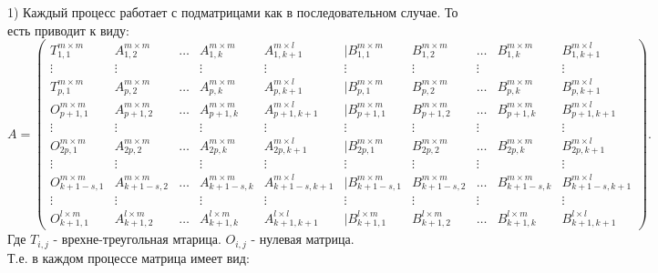 \documentclass[a4paper,12pt]{article}
\begin{document}
1) Каждый процесс работает с подматрицами как в последовательном случае. То есть приводит к виду:
\begin{equation*}
A = 
\begin{pmatrix}
T_{1,1}^{m \times m} & A_{1,2}^{m \times m} & \dots & A_{1,k}^{m \times m} & A_{1,k+1}^{m \times l} & | B_{1,1}^{m \times m} & B_{1,2}^{m \times m} & \dots & B_{1,k}^{m\times m} & B_{1,k+1}^{m \times l}\\
\vdots & \vdots &  & \vdots & \vdots &\vdots  &\vdots   &\vdots  & \  &\vdots \\
T_{p,1}^{m \times m} & A_{p,2}^{m \times m} & \dots & A_{p,k}^{m \times m} & A_{p,k+1}^{m \times l}& | B_{p,1}^{m \times m} & B_{p,2}^{m \times m} & \dots & B_{p,k}^{m\times m} & B_{p,k+1}^{m \times l}\\
\hline
O_{p+1,1}^{m \times m} & A_{p+1,2}^{m \times m} & \dots & A_{p+1,k}^{m \times m} & A_{p+1,k+1}^{m \times l} & | B_{p+1,1}^{m \times m} & B_{p+1,2}^{m \times m} & \dots & B_{p+1,k}^{m\times m} & B_{p+1,k+1}^{m \times l}\\
\vdots & \vdots &  & \vdots & \vdots &\vdots  &\vdots   &\vdots  & \  &\vdots \\O_{2p,1}^{m \times m} & A_{2p,2}^{m \times m} & \dots & A_{2p,k}^{m \times m} & A_{2p,k+1}^{m \times l} & | B_{2p,1}^{m \times m} & B_{2p,2}^{m \times m} & \dots & B_{2p,k}^{m\times m} & B_{2p,k+1}^{m \times l}\\
\hline
\vdots & \vdots &  & \vdots & \vdots &\vdots  &\vdots   &\vdots  & \  &\vdots \\\hline
O_{k+1-s,1}^{m \times m} & A_{k+1-s,2}^{m \times m} & \dots & A_{k+1-s,k}^{m \times m} & A_{k+1-s,k+1}^{m \times l} & | B_{k+1-s,1}^{m \times m} & B_{k+1-s,2}^{m \times m} & \dots & B_{k+1-s,k}^{m\times m} & B_{k+1-s,k+1}^{m \times l}\\
\vdots & \vdots &  & \vdots & \vdots &\vdots  &\vdots   &\vdots  & \  &\vdots \\
O_{k+1,1}^{l \times m} & A_{k+1,2}^{l \times m} & \dots & A_{k+1,k}^{l \times m} & A_{k+1,k+1}^{l \times l} & | B_{k+1,1}^{l \times m} & B_{k+1,2}^{l \times m} & \dots & B_{k+1,k}^{l\times m} & B_{k+1,k+1}^{l \times l}
\end{pmatrix}.
\end{equation*}
Где $T_{i,j}$ - врехне-треугольная мтарица. $O_{i,j}$ - нулевая матрица.\\
Т.е. в каждом процессе матрица имеет вид:\\
\end{document}
